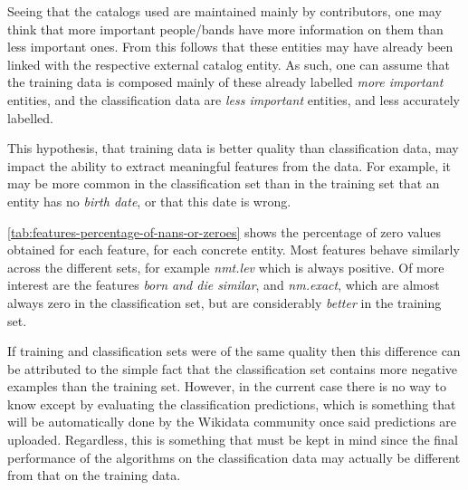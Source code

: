 \documentclass[epsfig,a4paper,11pt,titlepage,twoside,openany]{book}
\begin{document}
Seeing that the catalogs used are maintained mainly by contributors, one may think that more important people/bands have more information on them than less important ones. From this follows that these entities may have already been linked with the respective external catalog entity. As such, one can assume that the training data is composed mainly of these already labelled \textit{more important} entities, and the classification data are \textit{less important} entities, and less accurately labelled. 

This hypothesis, that training data is better quality than classification data, may impact the ability to extract meaningful features from the data. For example, it may be more common in the classification set than in the training set that an entity has no \textit{birth date}, or that this date is wrong.

\autoref{tab:features-percentage-of-nans-or-zeroes} shows the percentage of zero values obtained for each feature, for each concrete entity. Most features behave similarly across the different sets, for example \textit{nmt.lev} which is always positive. Of more interest are the features \textit{born and die similar}, and \textit{nm.exact}, which are almost always zero in the classification set, but are considerably \textit{better} in the training set.

If training and classification sets were of the same quality then this difference can be attributed to the simple fact that the classification set contains more negative examples than the training set. However, in the current case there is no way to know except by evaluating the classification predictions, which is something that will be automatically done by the Wikidata community once said predictions are uploaded. Regardless, this is something that must be kept in mind since the final performance of the algorithms on the classification data may actually be different from that on the training data. 
\end{document}
